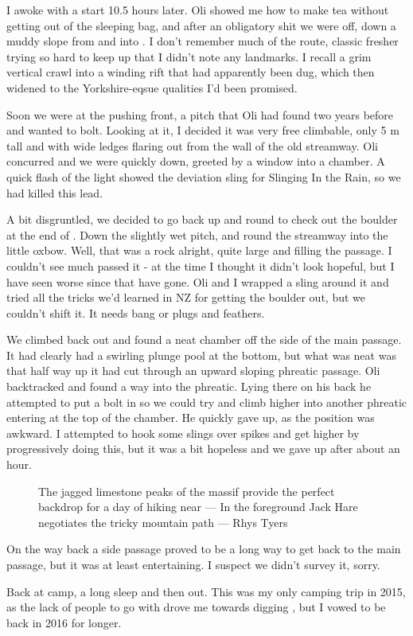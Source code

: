 I awoke with a start 10.5 hours later. Oli showed me how to make tea without getting out of the sleeping bag, and after an obligatory shit we were off, down a muddy slope from  and into . I don’t remember much of the route, classic fresher trying so hard to keep up that I didn’t note any landmarks. I recall a grim vertical crawl into a winding rift that had apparently been dug, which then widened to the Yorkshire-eqsue qualities I’d been promised.

Soon we were at the pushing front, a pitch that Oli had found two years before and wanted to bolt. Looking at it, I decided it was very free climbable, only 5 m tall and with wide ledges flaring out from the wall of the old streamway. Oli concurred and we were quickly down, greeted by a window into a chamber. A quick flash of the light showed the deviation sling for Slinging In the Rain, so we had killed this lead. 

A bit disgruntled, we decided to go back up and round to check out the boulder at the end of . Down the slightly wet pitch, and round the streamway into the little oxbow. Well, that was a rock alright, quite large and filling the passage. I couldn’t see much passed it - at the time I thought it didn’t look hopeful, but I have seen worse since that have gone. Oli and I wrapped a sling around it and tried all the tricks we’d learned in NZ for getting the boulder out, but we couldn’t shift it. It needs bang or plugs and feathers.

We climbed back out and found a neat chamber off the side of the main passage. It had clearly had a swirling plunge pool at the bottom, but what was neat was that half way up it had cut through an upward sloping phreatic passage. Oli backtracked and found a way into the phreatic. Lying there on his back he attempted to put a bolt in so we could try and climb higher into another phreatic entering at the top of the chamber. He quickly gave up, as the position was awkward. I attempted to hook some slings over spikes and get higher by progressively doing this, but it was a bit hopeless and we gave up after about an hour.

\begin{figure}[t!]
\checkoddpage \ifoddpage \forcerectofloat \else \forceversofloat \fi
\centering
{}
\caption{The jagged limestone peaks of the  massif provide the perfect backdrop for a day of hiking near  --- In the foreground Jack Hare negotiates the tricky mountain path --- Rhys Tyers}
\label{kukjack}
\end{figure}

On the way back a side passage proved to be a long way to get back to the main passage, but it was at least entertaining. I suspect we didn’t survey it, sorry.

Back at camp, a long sleep and then out. This was my only camping trip in 2015, as the lack of people to go with drove me towards digging , but I vowed to be back in 2016 for longer.

